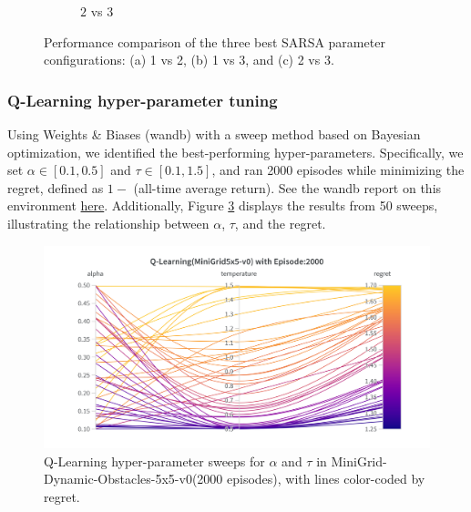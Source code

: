 \documentclass[11pt, a4]{article}
\begin{document}
\begin{figure}[H]
\begin{subfigure}{.7\textwidth}
						\caption{$2$ vs $3$}
						\label{fig:sarsaminigridworld2vs3}
					\end{subfigure}
					\caption{Performance comparison of the three best SARSA parameter configurations: (a) 1 vs 2, (b) 1 vs 3, and (c) 2 vs 3.}
					\label{fig:sarsaminigridworld}
				\end{figure}
			\subsubsection{Q-Learning hyper-parameter tuning}
			Using Weights \& Biases (wandb) with a sweep method based on Bayesian optimization, we identified the best-performing hyper-parameters. Specifically, we set $\alpha \in [0.1, 0.5]$ and $\tau \in [0.1, 1.5]$, and ran 2000 episodes while minimizing the regret, defined as \(1 -\) (all-time average return). See the wandb report on this environment \href{https://wandb.ai/ee24e009-iitm/minigrid-qlearning-softmax-tuning/reports/Q-Learning-MiniGrid-5x5-v0---VmlldzoxMjAyMTY4OQ?accessToken=7k22frexodx9vs7tryakvnme6ubxd011hcul9mke18nlhsfc8jtpo73poi45toq8}{here}. Additionally, Figure \ref{fig:qlearningminigridworld-regret} displays the results from 50 sweeps, illustrating the relationship between $\alpha$, $\tau$, and the regret.
			\begin{figure}[H]
				\centering
				\includegraphics[width=1\linewidth]{qlearning-hyp-tuning-minigridworld.png}
				\caption{Q-Learning hyper-parameter sweeps for $\alpha$ and $\tau$ in MiniGrid-Dynamic-Obstacles-5x5-v0(2000 episodes), with lines color-coded by regret.}
				\label{fig:qlearningminigridworld-regret}
			\end{figure}
\end{document}
